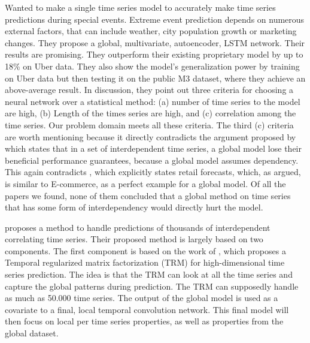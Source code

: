 \cite{Laptev}
Wanted to make a single time series model to
accurately make time series predictions during special events.
Extreme event prediction depends on numerous external factors,
that can include weather, city population growth or marketing
changes.
They propose a global, multivariate, autoencoder, LSTM network.
Their results are promising. They outperform their existing
proprietary model by up to 18\% on Uber data.
They also show the model's generalization power by training on Uber data
but then testing it on the public M3 dataset, where they achieve an above-average result.
In \cite{Laptev} discussion, they point out three criteria for
choosing a neural network over a statistical method:
(a) number of time series to the model are high, (b) Length of the
times series are high, and (c) correlation among the time series.
Our problem domain meets all these criteria.
The third (c) criteria are worth mentioning because it directly
contradicts the argument proposed by \cite{Montero-Manso2021}%
which states that in a set of interdependent time series,
a global model lose their beneficial performance guarantees,
because a global model assumes dependency.
This again contradicts \cite{Hewamalage2021}, which explicitly states
retail forecasts, which, as argued, is similar to E-commerce,
as a perfect example for a global model.
Of all the papers we found, none of them concluded that a global method
on time series that has some form of interdependency would directly hurt the model.



\cite{Sen2019} proposes a method to handle predictions of thousands of interdependent correlating time series.
Their proposed method is largely based on two components. The first component is based on the work of
\cite{Yu}, which proposes a Temporal regularized matrix factorization (TRM) for high-dimensional time series prediction.
The idea is that the TRM can look at all the time series and capture the global patterns during prediction.
The TRM can supposedly handle as much as 50.000 time series.
The output of the global model is used as a covariate to a final, local temporal convolution network. This final model
will then focus on local per time series properties, as well as properties from the global dataset.



